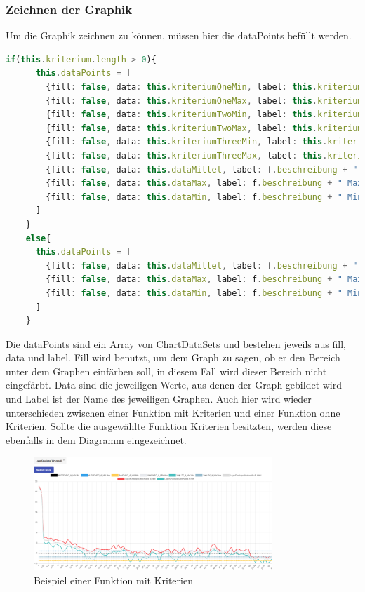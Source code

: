 \subsubsection{Zeichnen der Graphik}
Um die Graphik zeichnen zu können, müssen hier die dataPoints befüllt werden. 

\begin{lstlisting}[language=Typescript, caption={Befüllen der DataPoints}]
    if(this.kriterium.length > 0){
      this.dataPoints = [
        {fill: false, data: this.kriteriumOneMin, label: this.kriterium[0].name + " Min"},
        {fill: false, data: this.kriteriumOneMax, label: this.kriterium[0].name + " Max"},
        {fill: false, data: this.kriteriumTwoMin, label: this.kriterium[1].name + " Min"},
        {fill: false, data: this.kriteriumTwoMax, label: this.kriterium[1].name + " Max"},
        {fill: false, data: this.kriteriumThreeMin, label: this.kriterium[2].name + " Min"},
        {fill: false, data: this.kriteriumThreeMax, label: this.kriterium[2].name + " Max"},
        {fill: false, data: this.dataMittel, label: f.beschreibung + " Mittel"},
        {fill: false, data: this.dataMax, label: f.beschreibung + " Max"},
        {fill: false, data: this.dataMin, label: f.beschreibung + " Min"}
      ]
    }
    else{
      this.dataPoints = [
        {fill: false, data: this.dataMittel, label: f.beschreibung + " Mittel"},
        {fill: false, data: this.dataMax, label: f.beschreibung + " Max"},
        {fill: false, data: this.dataMin, label: f.beschreibung + " Min"}
      ]
    }
\end{lstlisting}

Die dataPoints sind ein Array von ChartDataSets und bestehen jeweils aus fill, data und label. Fill wird benutzt, um dem Graph zu sagen,
ob er den Bereich unter dem Graphen einfärben soll, in diesem Fall wird dieser Bereich nicht eingefärbt. Data sind die jeweiligen Werte,
aus denen der Graph gebildet wird und Label ist der Name des jeweiligen Graphen. Auch hier wird wieder unterschieden zwischen einer 
Funktion mit Kriterien und einer Funktion ohne Kriterien. Sollte die ausgewählte Funktion Kriterien besitzten, werden diese ebenfalls in
dem Diagramm eingezeichnet.

\begin{figure}[H]
    \centering
    \includegraphics[width=0.80\textwidth]{pics/graphwk.PNG}
    \caption{Beispiel einer Funktion mit Kriterien}
    \label{fig:graphwk}
\end{figure}

